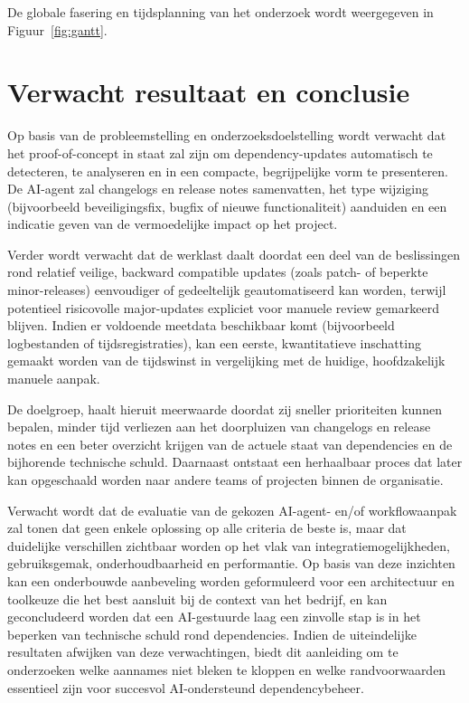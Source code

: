De globale fasering en tijdsplanning van het onderzoek wordt weergegeven in Figuur~\ref{fig:gantt}.


\section{Verwacht resultaat en conclusie}
\label{sec:verwachte_resultaten_en_conclusie}

Op basis van de probleemstelling en onderzoeksdoelstelling wordt verwacht dat het proof-of-concept in staat zal zijn om dependency-updates automatisch te detecteren, te analyseren en in een compacte, begrijpelijke vorm te presenteren. De AI-agent zal changelogs en release notes samenvatten, het type wijziging (bijvoorbeeld beveiligingsfix, bugfix of nieuwe functionaliteit) aanduiden en een indicatie geven van de vermoedelijke impact op het project.

Verder wordt verwacht dat de werklast daalt doordat een deel van de beslissingen rond relatief veilige, backward compatible updates (zoals patch- of beperkte minor-releases) eenvoudiger of gedeeltelijk geautomatiseerd kan worden, terwijl potentieel risicovolle major-updates expliciet voor manuele review gemarkeerd blijven. Indien er voldoende meetdata beschikbaar komt (bijvoorbeeld logbestanden of tijdsregistraties), kan een eerste, kwantitatieve inschatting gemaakt worden van de tijdswinst in vergelijking met de huidige, hoofdzakelijk manuele aanpak.

De doelgroep, haalt hieruit meerwaarde doordat zij sneller prioriteiten kunnen bepalen, minder tijd verliezen aan het doorpluizen van changelogs en release notes en een beter overzicht krijgen van de actuele staat van dependencies en de bijhorende technische schuld. Daarnaast ontstaat een herhaalbaar proces dat later kan opgeschaald worden naar andere teams of projecten binnen de organisatie.

Verwacht wordt dat de evaluatie van de gekozen AI-agent- en/of workflowaanpak zal tonen dat geen enkele oplossing op alle criteria de beste is, maar dat duidelijke verschillen zichtbaar worden op het vlak van integratiemogelijkheden, gebruiksgemak, onderhoudbaarheid en performantie. Op basis van deze inzichten kan een onderbouwde aanbeveling worden geformuleerd voor een architectuur en toolkeuze die het best aansluit bij de context van het bedrijf, en kan geconcludeerd worden dat een AI-gestuurde laag een zinvolle stap is in het beperken van technische schuld rond dependencies. Indien de uiteindelijke resultaten afwijken van deze verwachtingen, biedt dit aanleiding om te onderzoeken welke aannames niet bleken te kloppen en welke randvoorwaarden essentieel zijn voor succesvol AI-ondersteund dependencybeheer.

